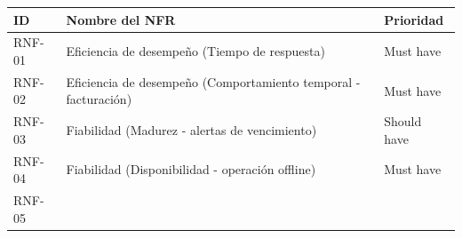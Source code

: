 \documentclass[
]{article}
\newcounter{none} %
\begin{document}
{\def\LTcaptype{none} %
\begin{longtable}[]{@{}
  >{\raggedright\arraybackslash}p{}
  >{\raggedright\arraybackslash}p{}
  >{\raggedright\arraybackslash}p{}@{}}
\toprule\noalign{}
\begin{minipage}[b]{\linewidth}\centering
\textbf{ID}
\end{minipage} & \begin{minipage}[b]{\linewidth}\raggedright
\textbf{Nombre del NFR}
\end{minipage} & \begin{minipage}[b]{\linewidth}\centering
\textbf{Prioridad}
\end{minipage} \\
\midrule\noalign{}
\endhead
\bottomrule\noalign{}
\endlastfoot
RNF-01 & \begin{minipage}[t]{\linewidth}\raggedright
Eficiencia de desempeño (Tiempo de respuesta)
\end{minipage} & \begin{minipage}[t]{\linewidth}\raggedright
Must have
\end{minipage} \\
RNF-02 & \begin{minipage}[t]{\linewidth}\raggedright
Eficiencia de desempeño (Comportamiento temporal - facturación)
\end{minipage} & \begin{minipage}[t]{\linewidth}\raggedright
Must have
\end{minipage} \\
RNF-03 & \begin{minipage}[t]{\linewidth}\raggedright
Fiabilidad (Madurez - alertas de vencimiento)
\end{minipage} & \begin{minipage}[t]{\linewidth}\raggedright
Should have
\end{minipage} \\
RNF-04 & \begin{minipage}[t]{\linewidth}\raggedright
Fiabilidad (Disponibilidad - operación offline)
\end{minipage} & \begin{minipage}[t]{\linewidth}\raggedright
Must have
\end{minipage} \\
RNF-05 & \begin{minipage}[t]{\linewidth}\raggedright

\end{minipage}
\end{longtable}}
\end{document}
